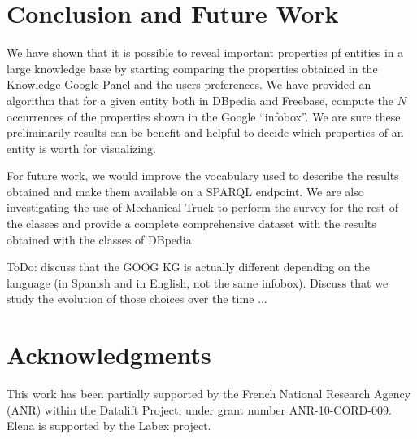 \documentclass[runningheads,a4paper]{llncs}
\begin{document}

\section{Conclusion and Future Work}
\label{sec:conclusion}
We have shown that it is possible to reveal important properties pf entities in a large knowledge base by starting comparing the properties obtained in the Knowledge Google Panel and the users preferences. We have provided an algorithm that for a given entity both in DBpedia and Freebase, compute the $N$ occurrences of the properties shown in the Google ``infobox''. We are sure these preliminarily results can be benefit and helpful to decide which properties of an entity is worth for visualizing.

For future work, we would improve the vocabulary used to describe the results obtained and make them available on a SPARQL endpoint. We are also investigating the use of Mechanical Truck to perform the survey for the rest of the classes and provide a complete comprehensive dataset with the results obtained with the classes of DBpedia.

ToDo: discuss that the GOOG KG is actually different depending on the language (in Spanish and in English, not the same infobox). Discuss that we study the evolution of those choices over the time ...


\section*{Acknowledgments} \label{sec:acknowledgments}
This work has been partially supported by the French National Research Agency (ANR) within the Datalift Project, under grant number ANR-10-CORD-009. Elena is supported by the Labex project.



\nocite{*}

\end{document}
